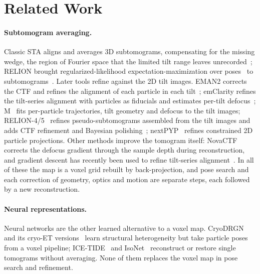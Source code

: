 \section{Related Work}
\label{sec:related}

\paragraph{Subtomogram averaging.}
Classic STA aligns and averages 3D subtomograms, compensating for the missing wedge, the region of Fourier space that the limited tilt range leaves unrecorded~\cite{forster2005av3,nicastro2006peet,castanodiez2012dynamo,hrabe2012pytom,wan2024stopgap}; RELION brought regularized-likelihood expectation-maximization over poses~\cite{scheres2012relion} to subtomograms~\cite{bharat2016relion}.
Later tools refine against the 2D tilt images.
EMAN2 corrects the CTF and refines the alignment of each particle in each tilt~\cite{chen2019eman2}; emClarity refines the tilt-series alignment with particles as fiducials and estimates per-tilt defocus~\cite{himes2018emclarity}; M~\cite{tegunov2021m} fits per-particle trajectories, tilt geometry and defocus to the tilt images; RELION-4/5~\cite{zivanov2022relion4,burt2024relion5} refines pseudo-subtomograms assembled from the tilt images and adds CTF refinement and Bayesian polishing~\cite{zivanov2019polishing}; nextPYP~\cite{liu2023nextpyp} refines constrained 2D particle projections.
Other methods improve the tomogram itself: NovaCTF~\cite{turonova2017novactf} corrects the defocus gradient through the sample depth during reconstruction, and gradient descent has recently been used to refine tilt-series alignment~\cite{chen2026tiltrefine}.
In all of these the map is a voxel grid rebuilt by back-projection, and pose search and each correction of geometry, optics and motion are separate steps, each followed by a new reconstruction.

\paragraph{Neural representations.}
Neural networks are the other learned alternative to a voxel map.
CryoDRGN~\cite{zhong2021cryodrgn} and its cryo-ET versions~\cite{rangan2024cryodrgnet,powell2024tomodrgn} learn structural heterogeneity but take particle poses from a voxel pipeline; ICE-TIDE~\cite{debarnot2025icetide} and IsoNet~\cite{liu2022isonet} reconstruct or restore single tomograms without averaging.
None of them replaces the voxel map in pose search and refinement.

